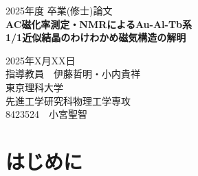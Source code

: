 \documentclass[11pt,a4j]{jreport}
\begin{document}
\thispagestyle{empty}
\begin{center}

\vspace{20mm}
{\Large\noindent 2025年度 卒業(修士)論文}\\
\vspace{40mm}
{\huge\noindent\textbf{AC磁化率測定・NMRによるAu-Al-Tb系}}\\
\medskip
{\huge\noindent\textbf{1/1近似結晶のわけわかめ磁気構造の解明}}\\
\vspace{\baselineskip}
\vspace{40mm}

{\Large\noindent
2025年X月XX日\\
\vspace{\baselineskip}
指導教員　伊藤哲明・小内貴祥    \\
\vspace{\baselineskip}
東京理科大学\\
先進工学研究科物理工学専攻 \\
\vspace{\baselineskip}
8423524　小宮聖智\\
}
\vspace{40mm}

\end{center}

\thispagestyle{empty}
\clearpage


\tableofcontents

\pagestyle{fancy}
\lhead{\rightmark}
\renewcommand{\chaptermark}[1]{\markboth{第\ \normalfont\thechapter\ 章~~#1}{}}

\chapter{はじめに} %
\end{document}
